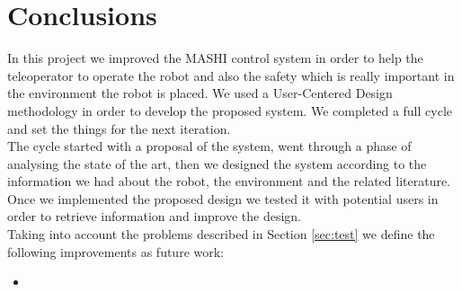 \section{Conclusions}
\label{sec:conclusions}


In this project we improved the MASHI control system in order to help the teleoperator to operate the robot and also the safety which is really important in the environment the robot is placed. We used a User-Centered Design methodology in order to develop the proposed system. We completed a full cycle and set the things for the next iteration. \\

The cycle started with a proposal of the system, went through a phase of analysing the state of the art, then we designed the system according to the information we had about the robot, the environment and the related literature. Once we implemented the proposed design we tested it with potential users in order to retrieve information and improve the design. \\

Taking into account the problems described in Section \ref{sec:test} we define the following improvements as future work:

\begin{itemize}
	\item
\end{itemize}


%
%
%
